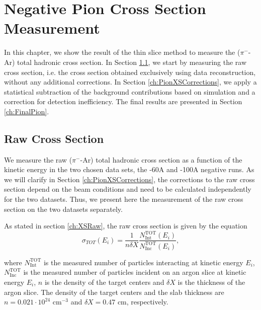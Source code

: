 \chapter{Negative Pion Cross Section Measurement}\label{ch:PionXS}

In this chapter, we show the result of the thin slice method to measure 
the ($\pi^-$-Ar) total hadronic cross section. In Section \ref{ch:PionXSRaw}, we start by measuring the raw cross section, i.e. the cross section obtained exclusively using data reconstruction, without any additional corrections. In Section \ref{ch:PionXSCorrections}, we apply a statistical subtraction of the background contributions based on simulation and a correction for detection inefficiency. The final results are presented in Section \ref{ch:FinalPion}.


\section{Raw Cross Section}\label{ch:PionXSRaw}
We measure the raw ($\pi^-$-Ar) total hadronic cross section as a function of the kinetic energy in the two chosen data sets, the -60A and -100A negative runs. 
As we will clarify in Section \ref{ch:PionXSCorrections},  the corrections to the raw cross section depend on the beam conditions and need to be calculated independently for the two datasets. Thus, we present here the measurement of the raw cross section on the two datasets separately.


As stated in section \ref{ch:XSRaw},  the raw cross section is given by the equation \label{eq:thinTargetXSSolved}
\begin{equation}
 \sigma_{TOT} (E_i)  = \frac{1}{n \delta X}\frac{N^{\text{TOT}}_{\text{Int}}(E_i)}{N^{\text{TOT}}_{\text{Inc}}(E_i)},
\end{equation}

where $N^{\text{TOT}}_{\text{Int}}$  is the measured number of particles interacting at kinetic energy $E_i$, $N^{\text{TOT}}_{\text{Inc}}$ is the  measured  number of particles incident  on an argon slice at  kinetic energy $E_i$,  $n$ is the density of the target centers  and $\delta X$ is the thickness of the argon slice. The density of the target centers and the slab thickness are $n = 0.021\cdot10^{24} \text{ cm}^{-3} $ and  $\delta X=0.47\text{ cm}$, respectively.


